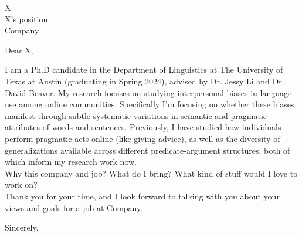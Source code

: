 \documentclass[myletter, a4paper, 11pt]{scrlttr2}
\begin{document}
\begin{letter}{
    X\\
    X's position\\
    Company
}


\opening{Dear X,}

I am a Ph.D candidate in the Department of Linguistics at The University of Texas at Austin (graduating in Spring 2024), advised by Dr. Jessy Li and Dr. David Beaver. My research focuses on studying interpersonal biases in language use among online communities. Specifically I'm focusing on whether these biases manifest through subtle systematic variations in semantic and pragmatic attributes of words and sentences. Previously, I have studied how individuals perform pragmatic acts online (like giving advice), as well as the diversity of generalizations available across different predicate-argument structures, both of which inform my research work now.\\

Why this company and job? What do I bring? What kind of stuff would I love to work on?\\

Thank you for your time, and I look forward to talking with you about your views and goals for a job at Company.

\closing{Sincerely,}


\end{letter}
\end{document}
